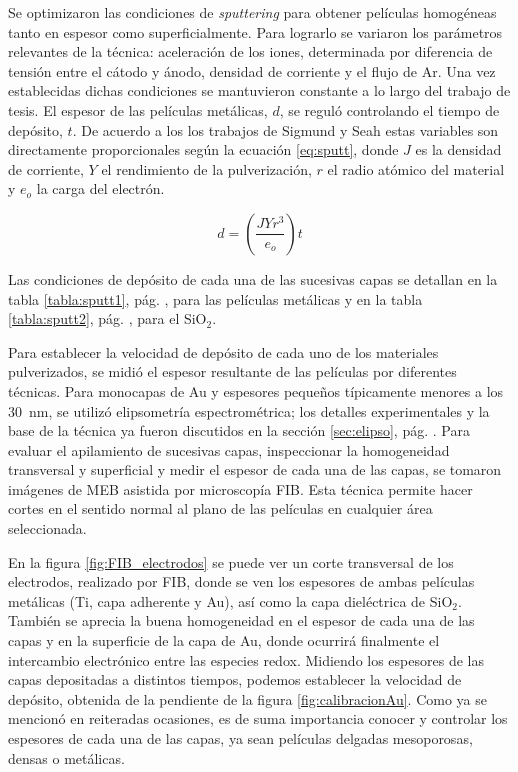 		 Se optimizaron las condiciones de \textit{sputtering} para obtener películas homogéneas tanto en espesor como superficialmente. Para lograrlo se variaron los parámetros relevantes de la técnica: aceleración de los iones, determinada por diferencia de tensión entre el cátodo y ánodo, densidad de corriente y el flujo de Ar. Una vez establecidas dichas condiciones se mantuvieron constante a lo largo del trabajo de tesis. El espesor de las películas metálicas, $d$, se reguló controlando el tiempo de depósito, $t$. De acuerdo a los los trabajos de Sigmund\cite{sigmund1968} y Seah\cite{Seah2005} estas variables son directamente proporcionales según la ecuación \ref{eq:sputt}, donde $J$ es la densidad de corriente, $Y$ el rendimiento de la pulverización, $r$ el radio atómico del material y $e_o$ la carga del electrón.

	 			\begin{equation}
	 				d=\left(\frac{JYr^3}{e_o}\right)t
	 				\label{eq:sputt}
	 			\end{equation}

		 Las condiciones de depósito de cada una de las sucesivas capas se detallan en la tabla \ref{tabla:sputt1}, pág. \pageref{tabla:sputt1}, para las películas metálicas y en la tabla  \ref{tabla:sputt2}, pág. \pageref{tabla:sputt2}, para el SiO$_2$. 

		 Para establecer la velocidad de depósito de cada uno de los materiales pulverizados, se midió el espesor resultante de las películas por diferentes técnicas. Para monocapas de Au y espesores pequeños típicamente menores a los \SI{30}{\nm}, se utilizó elipsometría espectrométrica; los detalles experimentales y la base de la técnica ya fueron discutidos en la sección \ref{sec:elipso}, pág. \pageref{sec:elipso}. Para evaluar el apilamiento de sucesivas capas, inspeccionar la homogeneidad transversal y superficial y medir el espesor de cada una de las capas, se tomaron imágenes de MEB asistida por microscopía FIB. Esta técnica permite hacer cortes en el sentido normal al plano de las películas en cualquier área seleccionada.
		
		 En la figura \ref{fig:FIB_electrodos} se puede ver un corte transversal de los electrodos, realizado por FIB, donde se ven los espesores de ambas películas metálicas (Ti, capa adherente y Au), así como la capa dieléctrica de SiO$_2$. También se aprecia la buena homogeneidad en el espesor de cada una de las capas y en la superficie de la capa de Au, donde ocurrirá finalmente el intercambio electrónico entre las especies redox. Midiendo los espesores de las capas depositadas a distintos tiempos, podemos establecer la velocidad de depósito, obtenida de la pendiente de la figura \ref{fig:calibracionAu}. Como ya se mencionó en reiteradas ocasiones, es de suma importancia conocer y controlar los espesores de cada una de las capas, ya sean películas delgadas mesoporosas, densas o metálicas.


